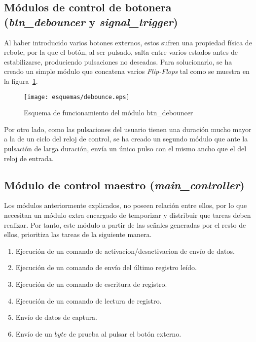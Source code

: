 \subsection{Módulos de control de botonera (\emph{btn\_debouncer} y \emph{signal\_trigger})}
Al haber introducido varios botones externos, estos sufren una propiedad física de rebote, por la que el botón, al ser pulsado, salta entre varios estados antes de estabilizarse, produciendo pulsaciones no deseadas. Para solucionarlo, se ha creado un simple módulo que concatena varios \emph{Flip-Flops} tal como se muestra en la figura~\ref{fig:esquema-debounce}.

\begin{figure}[htb]
    \centering
    \texttt{[image: esquemas/debounce.eps]}
    \caption{Esquema de funcionamiento del módulo btn\_debouncer}
    \label{fig:esquema-debounce}
\end{figure}

Por otro lado, como las pulsaciones del usuario tienen una duración mucho mayor a la de un ciclo del reloj de control, se ha creado un segundo módulo que ante la pulsación de larga duración, envía un único pulso con el mismo ancho que el del reloj de entrada.


\subsection{Módulo de control maestro (\emph{main\_controller})}
Los módulos anteriormente explicados, no poseen relación entre ellos, por lo que necesitan un módulo extra encargado de temporizar y distribuir que tareas deben realizar. Por tanto, este módulo a partir de las señales generadas por el resto de ellos, prioritiza las tareas de la siguiente manera.
\begin{enumerate}
    \item Ejecución de un comando de activacion/desactivacion de envío de datos.
    \item Ejecución de un comando de envío del último registro leído.
    \item Ejecución de un comando de escritura de registro.
    \item Ejecución de un comando de lectura de registro.
    \item Envío de datos de captura.
    \item Envío de un $byte$ de prueba al pulsar el botón externo.
\end{enumerate}



